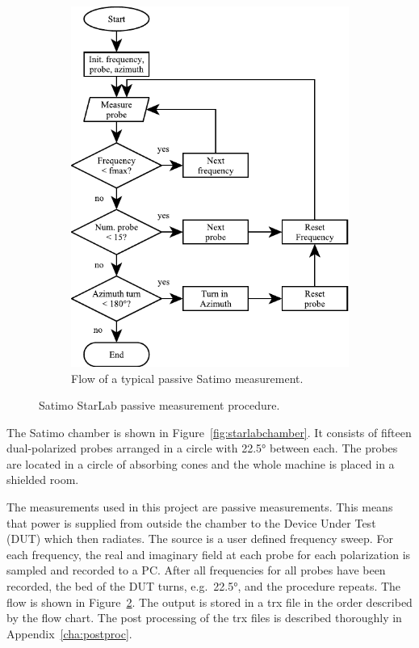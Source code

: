 \begin{figure}[htbp]
\begin{subfigure}[t]{0.49\linewidth}
        \includegraphics{img/analysis/satimoflow}
        \caption{Flow of a typical passive Satimo measurement.}
        \label{fig:satimoflow}
    \end{subfigure}
    \caption{Satimo StarLab passive measurement procedure.}
\end{figure}

The Satimo chamber is shown in Figure~\ref{fig:starlabchamber}. It consists of fifteen dual-polarized probes arranged in a circle with \ang{22.5} between each. The probes are located in a circle of absorbing cones and the whole machine is placed in a shielded room.

The measurements used in this project are passive measurements. This means that power is supplied from outside the chamber to the Device Under Test (DUT) which then radiates. The source is a user defined frequency sweep. For each frequency, the real and imaginary field at each probe for each polarization is sampled and recorded to a PC. After all frequencies for all probes have been recorded, the bed of the DUT turns, e.g.\ \ang{22.5}, and the procedure repeats. The flow is shown in Figure~\ref{fig:satimoflow}. The output is stored in a trx file in the order described by the flow chart. The post processing of the trx files is described thoroughly in Appendix~\ref{cha:postproc}.

